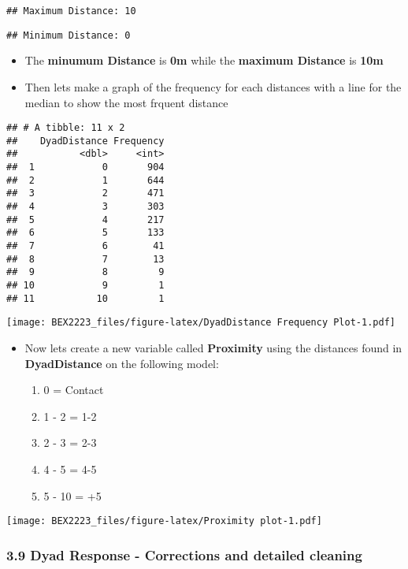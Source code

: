 \documentclass[
]{article}
\providecommand{\tightlist}{%
  \setlength{\itemsep}{0pt}\setlength{\parskip}{0pt}}
\begin{document}
\begin{verbatim}
## Maximum Distance: 10
\end{verbatim}

\begin{verbatim}
## Minimum Distance: 0
\end{verbatim}

\begin{itemize}
\tightlist
\item
  The \textbf{minumum Distance} is \textbf{0m} while the \textbf{maximum
  Distance} is \textbf{10m}
\item
  Then lets make a graph of the frequency for each distances with a line
  for the median to show the most frquent distance
\end{itemize}

\begin{verbatim}
## # A tibble: 11 x 2
##    DyadDistance Frequency
##           <dbl>     <int>
##  1            0       904
##  2            1       644
##  3            2       471
##  4            3       303
##  5            4       217
##  6            5       133
##  7            6        41
##  8            7        13
##  9            8         9
## 10            9         1
## 11           10         1
\end{verbatim}

\texttt{[image: BEX2223\_files/figure-latex/DyadDistance Frequency Plot-1.pdf]}

\begin{itemize}
\tightlist
\item
  Now lets create a new variable called \textbf{Proximity} using the
  distances found in \textbf{DyadDistance} on the following model:

  \begin{enumerate}
  \def\labelenumi{\alph{enumi}.}
  \tightlist
  \item
    0 = Contact
  \item
    1 - 2 = 1-2
  \item
    2 - 3 = 2-3
  \item
    4 - 5 = 4-5
  \item
    5 - 10 = +5
  \end{enumerate}
\end{itemize}

\texttt{[image: BEX2223\_files/figure-latex/Proximity plot-1.pdf]}

\hypertarget{dyad-response---corrections-and-detailed-cleaning}{%
\subsubsection{3.9 Dyad Response - Corrections and detailed
cleaning}\label{dyad-response---corrections-and-detailed-cleaning}}
\end{document}
